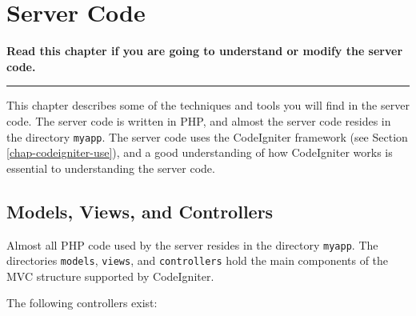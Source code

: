 \documentclass[11pt,oneside,a4paper]{memoir}
\begin{document}
\chapter{Server Code}\label{chap-server-code}

\textbf{Read this chapter if you are going to understand or modify the server code.}
\plainbreak{3}

This chapter describes some of the techniques and tools you will find in the server code. The server
code is written in PHP, and almost the server code resides in the directory \texttt{myapp}. The
server code uses the CodeIgniter framework (see Section \ref{chap-codeigniter-use}), and a good
understanding of how CodeIgniter works is essential to understanding the server code.

\section{Models, Views, and Controllers}

Almost all PHP code used by the server resides in the directory \texttt{myapp}. The directories
\texttt{models}, \texttt{views}, and \texttt{controllers} hold the main components of the MVC
structure supported by CodeIgniter.

The following controllers exist:
\end{document}
